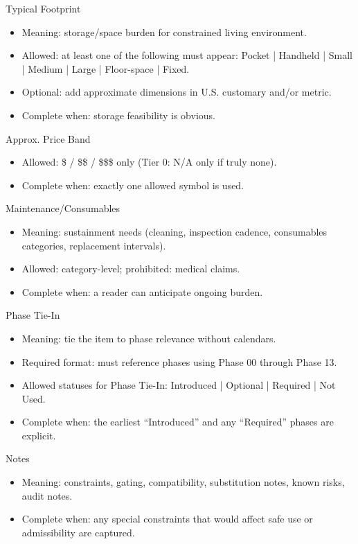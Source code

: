 \documentclass[10pt]{article}
\begin{document}
Typical Footprint

\begin{itemize}
\item Meaning: storage/space burden for constrained living environment.
\item Allowed: at least one of the following must appear: Pocket | Handheld | Small | Medium | Large | Floor-space | Fixed.
\item Optional: add approximate dimensions in U.S. customary and/or metric.
\item Complete when: storage feasibility is obvious.
\end{itemize}

Approx. Price Band

\begin{itemize}
\item Allowed: \$ / \$\$ / \$\$\$ only (Tier 0: N/A only if truly none).
\item Complete when: exactly one allowed symbol is used.
\end{itemize}

Maintenance/Consumables

\begin{itemize}
\item Meaning: sustainment needs (cleaning, inspection cadence, consumables categories, replacement intervals).
\item Allowed: category-level; prohibited: medical claims.
\item Complete when: a reader can anticipate ongoing burden.
\end{itemize}

Phase Tie-In

\begin{itemize}
\item Meaning: tie the item to phase relevance without calendars.
\item Required format: must reference phases using Phase 00 through Phase 13.
\item Allowed statuses for Phase Tie-In: Introduced | Optional | Required | Not Used.
\item Complete when: the earliest “Introduced” and any “Required” phases are explicit.
\end{itemize}

Notes

\begin{itemize}
\item Meaning: constraints, gating, compatibility, substitution notes, known risks, audit notes.
\item Complete when: any special constraints that would affect safe use or admissibility are captured.
\end{itemize}
\end{document}

